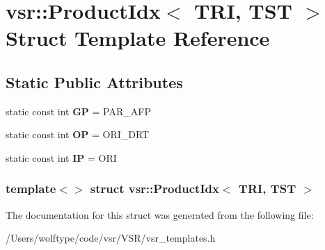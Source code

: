\hypertarget{structvsr_1_1_product_idx_3_01_t_r_i_00_01_t_s_t_01_4}{\section{vsr\-:\-:Product\-Idx$<$ T\-R\-I, T\-S\-T $>$ Struct Template Reference}
\label{structvsr_1_1_product_idx_3_01_t_r_i_00_01_t_s_t_01_4}
}
\subsection*{Static Public Attributes}
\begin{DoxyCompactItemize}
\item 
\hypertarget{structvsr_1_1_product_idx_3_01_t_r_i_00_01_t_s_t_01_4_a2f9ea52e21a741bfd2125e70154ef19b}{static const int {\bfseries G\-P} = P\-A\-R\-\_\-\-A\-F\-P}\label{structvsr_1_1_product_idx_3_01_t_r_i_00_01_t_s_t_01_4_a2f9ea52e21a741bfd2125e70154ef19b}

\item 
\hypertarget{structvsr_1_1_product_idx_3_01_t_r_i_00_01_t_s_t_01_4_a455e4b2ea565613ad2aba48c3d3bacb3}{static const int {\bfseries O\-P} = O\-R\-I\-\_\-\-D\-R\-T}\label{structvsr_1_1_product_idx_3_01_t_r_i_00_01_t_s_t_01_4_a455e4b2ea565613ad2aba48c3d3bacb3}

\item 
\hypertarget{structvsr_1_1_product_idx_3_01_t_r_i_00_01_t_s_t_01_4_a54fbd5edc40fee9e8a5d3673e49f729b}{static const int {\bfseries I\-P} = O\-R\-I}\label{structvsr_1_1_product_idx_3_01_t_r_i_00_01_t_s_t_01_4_a54fbd5edc40fee9e8a5d3673e49f729b}

\end{DoxyCompactItemize}
\subsubsection*{template$<$$>$ struct vsr\-::\-Product\-Idx$<$ T\-R\-I, T\-S\-T $>$}



The documentation for this struct was generated from the following file\-:\begin{DoxyCompactItemize}
\item 
/\-Users/wolftype/code/vsr/\-V\-S\-R/vsr\-\_\-templates.\-h\end{DoxyCompactItemize}
